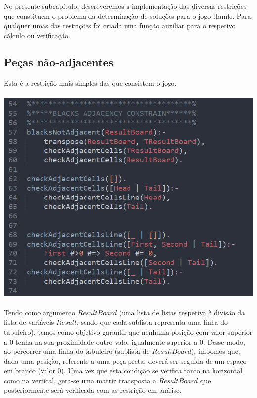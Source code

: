 No presente subcap\'itulo, descreveremos a implementa\c{c}\~ao das diversas restri\c{c}\~oes que constituem o problema da determina\c{c}\~ao de solu\c{c}\~oes para o jogo Hamle. Para qualquer umas das restri\c{c}\~oes foi criada uma fun\c{c}\~ao auxiliar para o respetivo c\'alculo ou verifica\c{c}\~ao.

\subsection{Pe\c{c}as n\~ao-adjacentes}
Esta \'e a restri\c{c}\~ao mais simples das que consistem o jogo. 
\\ \\
\includegraphics[scale=0.5]{no-adjacents.png}
\\ \\
Tendo como argumento $ResultBoard$ (uma lista de listas respetiva \`a divis\~ao da lista de vari\'aveis $Result$, sendo que cada sublista representa uma linha do tabuleiro), temos como objetivo garantir que nenhuma posi\c{c}\~ao com valor superior a 0 tenha na sua proximidade outro valor igualmente superior a 0. Desse modo, ao percorrer uma linha do tabuleiro (sublista de $ResultBoard$), impomos que, dada uma posi\c{c}\~ao, referente a uma pe\c{c}a preta, dever\'a ser seguida de um espa\c{c}o em branco (valor 0). Uma vez que esta condi\c{c}\~ao se verifica tanto na horizontal como na vertical, gera-se uma matriz transposta a $ResultBoard$ que posteriormente ser\'a verificada com as restri\c{c}\~ao em an\'alise.
\\ \\ \\ \\ \\ \\ \\ \\


